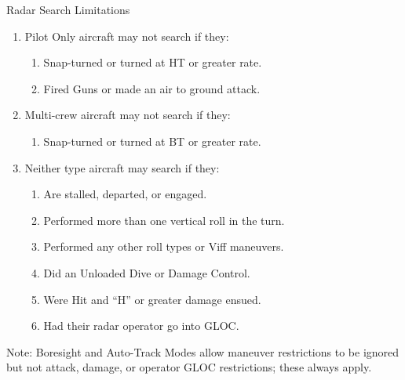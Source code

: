 \begin{table}
\centering
\caption{Radar Search Limitations}
\medskip
\begin{minipage}{\linewidth}
\begin{enumerate}
    \item Pilot Only aircraft may not search if they:
    \begin{enumerate}
        \item Snap-turned or turned at HT or greater rate.
        \item Fired Guns or made an air to ground attack.
    \end{enumerate}
    \item Multi-crew aircraft may not search if they:
    \begin{enumerate}
        \item Snap-turned or turned at BT or greater rate.
    \end{enumerate}    
    \item Neither type aircraft may search if they:
    \begin{enumerate}
        \item Are stalled, departed, or engaged.
        \item Performed more than one vertical roll in the turn.
        \item Performed any other roll types or Viff maneuvers.
        \item Did an Unloaded Dive or Damage Control.
        \item Were Hit and “H” or greater damage ensued.
        \item Had their radar operator go into GLOC.
    \end{enumerate}        
\end{enumerate}
\medskip
Note: Boresight and Auto-Track Modes allow maneuver restrictions to be ignored but not attack, damage, or operator GLOC restrictions; these always apply.
\end{minipage}
\end{table}

